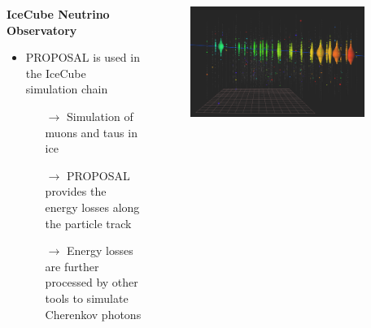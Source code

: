 \begin{frame}[c]
    \begin{columns}[onlytextwidth]
    \begin{column}{0.55\textwidth}
    \textbf{IceCube Neutrino Observatory}
        \begin{itemize}
            \item PROPOSAL is used in the IceCube simulation chain
            \begin{itemize}
                \item[$\rightarrow$] Simulation of muons and taus in ice
                \item[$\rightarrow$] PROPOSAL provides the energy losses along the particle track
                \item[$\rightarrow$] Energy losses are further processed by other tools to simulate Cherenkov photons
            \end{itemize}
        \end{itemize}
    \end{column}
        \begin{column}{0.45\textwidth}
            \begin{figure}
                \centering
                \includegraphics[width=0.9\textwidth]{images/Track.png}
            \end{figure}
        \end{column}
    \end{columns}
\end{frame}


